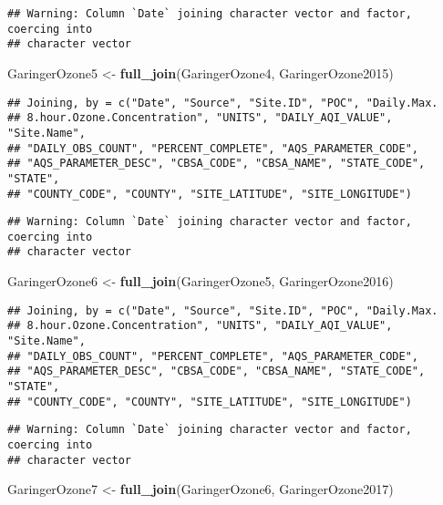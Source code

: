 \documentclass[
]{article}
\newenvironment{Shaded}{\begin{snugshade}}{\end{snugshade}}
\newcommand{\KeywordTok}[1]{\textcolor[rgb]{0.13,0.29,0.53}{\textbf{#1}}}
\newcommand{\NormalTok}[1]{#1}
\newcommand{\StringTok}[1]{\textcolor[rgb]{0.31,0.60,0.02}{#1}}
\begin{document}
\begin{verbatim}
## Warning: Column `Date` joining character vector and factor, coercing into
## character vector
\end{verbatim}

\begin{Shaded}
\begin{Highlighting}[]
\NormalTok{GaringerOzone5 <-}\StringTok{ }\KeywordTok{full_join}\NormalTok{(GaringerOzone4, GaringerOzone2015)}
\end{Highlighting}
\end{Shaded}

\begin{verbatim}
## Joining, by = c("Date", "Source", "Site.ID", "POC", "Daily.Max.
## 8.hour.Ozone.Concentration", "UNITS", "DAILY_AQI_VALUE", "Site.Name",
## "DAILY_OBS_COUNT", "PERCENT_COMPLETE", "AQS_PARAMETER_CODE",
## "AQS_PARAMETER_DESC", "CBSA_CODE", "CBSA_NAME", "STATE_CODE", "STATE",
## "COUNTY_CODE", "COUNTY", "SITE_LATITUDE", "SITE_LONGITUDE")
\end{verbatim}

\begin{verbatim}
## Warning: Column `Date` joining character vector and factor, coercing into
## character vector
\end{verbatim}

\begin{Shaded}
\begin{Highlighting}[]
\NormalTok{GaringerOzone6 <-}\StringTok{ }\KeywordTok{full_join}\NormalTok{(GaringerOzone5, GaringerOzone2016)}
\end{Highlighting}
\end{Shaded}

\begin{verbatim}
## Joining, by = c("Date", "Source", "Site.ID", "POC", "Daily.Max.
## 8.hour.Ozone.Concentration", "UNITS", "DAILY_AQI_VALUE", "Site.Name",
## "DAILY_OBS_COUNT", "PERCENT_COMPLETE", "AQS_PARAMETER_CODE",
## "AQS_PARAMETER_DESC", "CBSA_CODE", "CBSA_NAME", "STATE_CODE", "STATE",
## "COUNTY_CODE", "COUNTY", "SITE_LATITUDE", "SITE_LONGITUDE")
\end{verbatim}

\begin{verbatim}
## Warning: Column `Date` joining character vector and factor, coercing into
## character vector
\end{verbatim}

\begin{Shaded}
\begin{Highlighting}[]
\NormalTok{GaringerOzone7 <-}\StringTok{ }\KeywordTok{full_join}\NormalTok{(GaringerOzone6, GaringerOzone2017)}
\end{Highlighting}
\end{Shaded}
\end{document}
